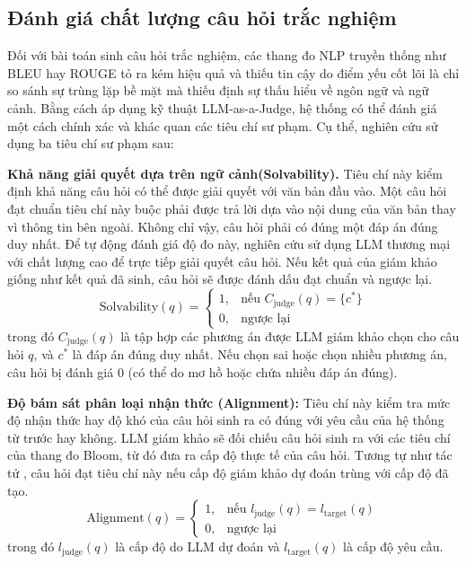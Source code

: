 \subsection{Đánh giá chất lượng câu hỏi trắc nghiệm}

Đối với bài toán sinh câu hỏi trắc nghiệm, các thang đo NLP truyền thống như BLEU hay ROUGE tỏ ra kém hiệu quả và thiếu tin cậy do điểm yếu cốt lõi là chỉ so sánh sự trùng lặp bề mặt mà thiếu định sự thấu hiểu về ngôn ngữ và ngữ cảnh. Bằng cách áp dụng kỹ thuật LLM-as-a-Judge, hệ thống có thể đánh giá một cách chính xác và khác quan các tiêu chí sư phạm. Cụ thể, nghiên cứu sử dụng ba tiêu chí sư phạm sau:

\textbf{Khả năng giải quyết dựa trên ngữ cảnh(Solvability).} Tiêu chí này kiểm định khả năng câu hỏi có thể được giải quyết với văn bản đầu vào. Một câu hỏi đạt chuẩn tiêu chí này buộc phải được trả lời dựa vào nội dung của văn bản thay vì thông tin bên ngoài. Không chỉ vậy, câu hỏi phải có đúng một đáp án đúng duy nhất. Để tự động đánh giá độ đo này, nghiên cứu sử dụng LLM thương mại với chất lượng cao để trực tiếp giải quyết câu hỏi. Nếu kết quả của giám khảo giống như kết quả đã sinh, câu hỏi sẽ được đánh dấu đạt chuẩn và ngược lại. 
   $$\text{Solvability}(q) = \begin{cases} 1, & \text{nếu } C_{\text{judge}}(q) = \{c^*\} \\ 0, & \text{ngược lại} \end{cases}$$
    trong đó $C_{\text{judge}}(q)$ là tập hợp các phương án được LLM giám khảo chọn cho câu hỏi $q$, và $c^*$ là đáp án đúng duy nhất. Nếu chọn sai hoặc chọn nhiều phương án, câu hỏi bị đánh giá 0 (có thể do mơ hồ hoặc chứa nhiều đáp án đúng).

   \textbf{Độ bám sát phân loại nhận thức (Alignment):}  Tiêu chí này kiểm tra mức độ nhận thức hay độ khó của câu hỏi sinh ra có đúng với yêu cầu của hệ thống từ trước hay không. LLM giám khảo sẽ đối chiếu câu hỏi sinh ra với các tiêu chí của thang đo Bloom, từ đó đưa ra cấp độ thực tế của câu hỏi. Tương tự như tác tử , câu hỏi đạt tiêu chí này nếu cấp độ giám khảo dự đoán trùng với cấp độ đã tạo.
   $$\text{Alignment}(q) = \begin{cases} 1, & \text{nếu } l_{\text{judge}}(q) = l_{\text{target}}(q) \\ 0, & \text{ngược lại} \end{cases}$$
    trong đó $l_{\text{judge}}(q)$ là cấp độ do LLM dự đoán và $l_{\text{target}}(q)$ là cấp độ yêu cầu.

